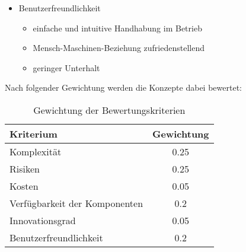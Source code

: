 \begin{itemize}
	\item Benutzerfreundlichkeit
	\begin{itemize}
	\item einfache und intuitive Handhabung im Betrieb	
		
	\item Mensch-Maschinen-Beziehung zufriedenstellend
	
	\item geringer Unterhalt
	
	\end{itemize}

\end{itemize}

Nach folgender Gewichtung werden die Konzepte dabei bewertet:
\begin{table}[H]
	\begin{tabular}{|l|c|}
	\hline 
	\textbf{Kriterium} & \textbf{Gewichtung} \\ 
	\hline 
	Komplexität & 0.25 \\ 
	\hline 
	Risiken & 0.25 \\ 
	\hline 
	Kosten & 0.05 \\ 
	\hline 
	Verfügbarkeit der Komponenten & 0.2 \\ 
	\hline 
	Innovationsgrad & 0.05 \\ 
	\hline 
	Benutzerfreundlichkeit & 0.2 \\ 
	\hline 
	\end{tabular} 
	\caption{Gewichtung der Bewertungskriterien}
	\label{tab:gewichtung}
\end{table}

